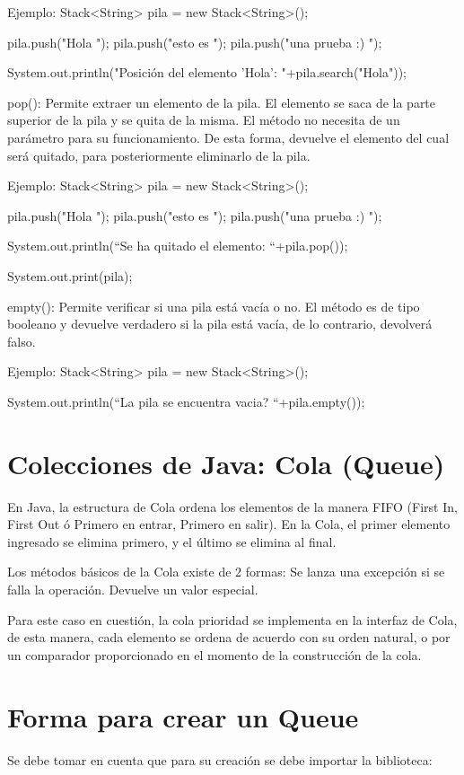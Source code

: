 \documentclass[12pt, letterpaper]{article} %
\begin{document}
Ejemplo:
Stack<String> pila = new Stack<String>();

pila.push("Hola ");
pila.push("esto es ");
pila.push("una prueba :) ");

System.out.println("Posición del elemento 'Hola':  "+pila.search("Hola"));


pop():
Permite extraer un elemento de la pila. El elemento se saca de la parte superior de la pila y se quita de la misma. El método no necesita de un parámetro para su funcionamiento. De esta forma, devuelve el elemento del cual será quitado, para posteriormente eliminarlo de la pila. 

Ejemplo:
Stack<String> pila = new Stack<String>();

pila.push("Hola ");
pila.push("esto es ");
pila.push("una prueba :) ");

System.out.println(“Se ha quitado el elemento: “+pila.pop());

System.out.print(pila);


empty():
Permite verificar si una pila está vacía o no. El método es de tipo booleano y devuelve verdadero si la pila está vacía, de lo contrario, devolverá falso.

Ejemplo:
Stack<String> pila = new Stack<String>();

System.out.println(“La pila se encuentra vacia? “+pila.empty());


\section{Colecciones de Java: Cola (Queue)}
En Java, la estructura de Cola ordena los elementos de la manera FIFO (First In, First Out ó Primero en entrar, Primero en salir). En la Cola, el primer elemento ingresado se elimina primero, y el último se elimina al final.

Los métodos básicos de la Cola existe de 2 formas:
Se lanza una excepción si se falla la operación.
Devuelve un valor especial.


Para este caso en cuestión, la cola prioridad se implementa en la interfaz de Cola, de esta manera, cada elemento se ordena de acuerdo con su orden natural, o por un comparador proporcionado en el momento de la construcción de la cola.

\section*{Forma para crear un Queue}
Se debe tomar en cuenta que para su creación se debe importar la biblioteca:
\end{document}
